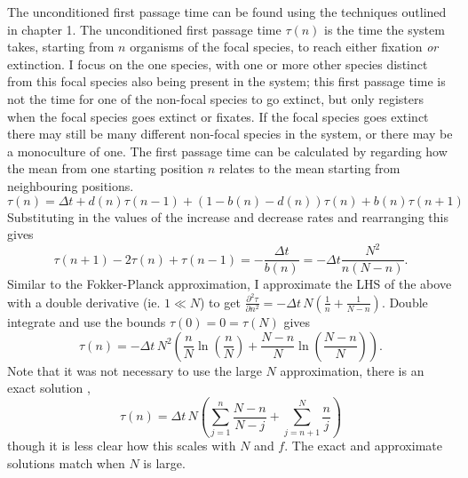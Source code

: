 The unconditioned first passage time can be found using the techniques outlined in chapter 1. 
The unconditioned first passage time $\tau(n)$ is the time the system takes, starting from $n$ organisms of the focal species, to reach either fixation \emph{or} extinction. 
I focus on the one species, with one or more other species distinct from this focal species also being present in the system; this first passage time is not the time for one of the non-focal species to go extinct, but only registers when the focal species goes extinct or fixates. 
If the focal species goes extinct there may still be many different non-focal species in the system, or there may be a monoculture of one. 
The first passage time can be calculated by regarding how the mean from one starting position $n$ relates to the mean starting from neighbouring positions.
\begin{equation}
\tau(n) = \Delta t + d(n)\tau(n-1) + \left(1-b(n)-d(n)\right)\tau(n) + b(n)\tau(n+1)
\end{equation}
Substituting in the values of the increase and decrease rates and rearranging this gives
\begin{equation*}
\tau(n+1) - 2\tau(n) + \tau(n-1) = -\frac{\Delta t}{b(n)} = -\Delta t\frac{N^2}{n(N-n)}. %
\end{equation*}
Similar to the Fokker-Planck approximation, I approximate the LHS of the above with a double derivative (ie. $1\ll N$) to get $\frac{\partial^2\tau}{\partial n^2} = -\Delta t\,N\left(\frac{1}{n}+\frac{1}{N-n}\right)$. 
Double integrate and use the bounds $\tau(0) = 0 = \tau(N)$ gives
\begin{equation}
\tau(n) = -\Delta t\,N^2\left(\frac{n}{N}\ln\left(\frac{n}{N}\right)+\frac{N-n}{N}\ln\left(\frac{N-n}{N}\right)\right).
\end{equation}
Note that it was not necessary to use the large $N$ approximation, there is an exact solution \cite{Moran1962},
\begin{equation}
\tau(n) = \Delta t\,N\left(\sum_{j=1}^n\frac{N-n}{N-j} + \sum_{j=n+1}^N\frac{n}{j}\right)
\end{equation}
though it is less clear how this scales with $N$ and $f$. 
The exact and approximate solutions match when $N$ is large. 


